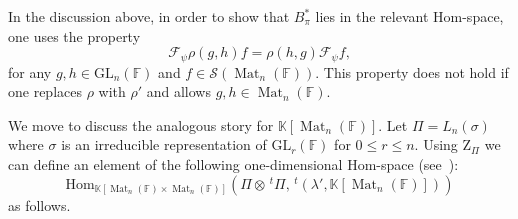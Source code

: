 \documentclass[12pt, reqno]{amsart}
\theoremstyle{definition}
\newcommand{\coefficientsField}{\mathbb{K}}
\newcommand{\Hom}{\mathrm{Hom}}
\newcommand{\transpose}[1]{\, {}^{t}#1}
\newcommand{\zetaIntegral}{\mathrm{Z}}
\newcommand{\fieldCharacter}{\psi}
\newcommand{\GL}{\mathrm{GL}}
\newcommand{\finiteField}{\mathbb{F}}
\newcommand{\squareMatrix}{\operatorname{Mat}}
\newcommand{\fourierTransform}[1]{\mathcal{F}_{#1}}
\newcommand{\Schwartz}{\mathcal{S}}
\begin{document}
	In the discussion above, in order to show that $B_{\pi}^{\ast}$ lies in the relevant Hom-space, one uses the property \begin{displaymath}
		\fourierTransform{\fieldCharacter} \rho\left(g, h\right) f = \rho\left(h, g\right) \fourierTransform{\fieldCharacter}f,
	\end{displaymath}
	for any $g,h \in \GL_n\left(\finiteField\right)$ and $f \in \Schwartz\left(\squareMatrix_n\left(\finiteField\right)\right)$. This property does not hold if one replaces $\rho$ with $\rho'$ and allows $g,h \in \squareMatrix_n\left(\finiteField\right)$.
	
	We move to discuss the analogous story for $\coefficientsField\left[\squareMatrix_n\left(\finiteField\right)\right]$. Let $\Pi = L_n\left(\sigma\right)$ where $\sigma$ is an irreducible representation of $\GL_r\left(\finiteField\right)$ for $0 \le r \le n$. Using $\zetaIntegral_{\Pi}$ we can define an element of the following one-dimensional Hom-space (see~\cite[Section 6]{HarmanSnowdenZelingher2025}):
	\begin{displaymath}
		\Hom_{\coefficientsField\left[\squareMatrix_n\left(\finiteField\right) \times \squareMatrix_n\left(\finiteField\right)\right]}\left(\Pi \otimes \transpose{\Pi}, \transpose{\left(\lambda', \coefficientsField\left[\squareMatrix_n\left(\finiteField\right)\right]\right)}\right)
	\end{displaymath}
	as follows. 
	
\end{document}
